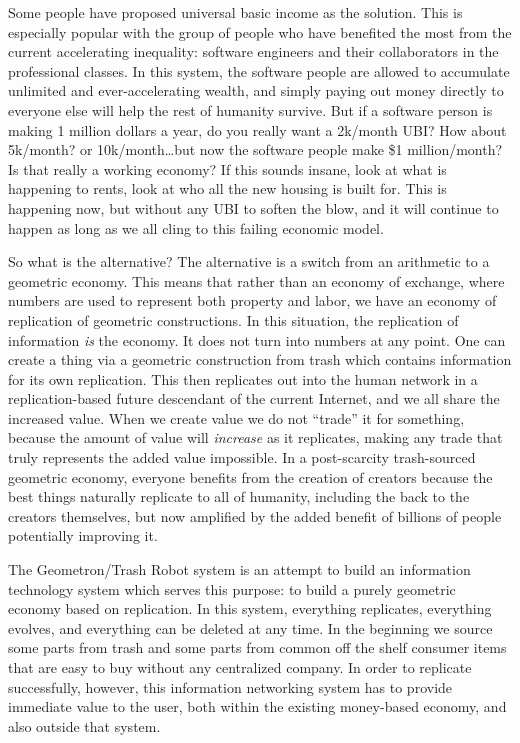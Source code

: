 \documentclass[12pt,a4paper]{amsart}
\numberwithin{equation}{section}
\begin{document}
Some people have proposed universal basic income as the solution. This
is especially popular with the group of people who have benefited the
most from the current accelerating inequality: software engineers and
their collaborators in the professional classes. In this system, the
software people are allowed to accumulate unlimited and
ever-accelerating wealth, and simply paying out money directly to
everyone else will help the rest of humanity survive. But if a software
person is making 1 million dollars a year, do you really want a 2k/month
UBI? How about 5k/month? or 10k/month\ldots{}but now the software people
make \$1 million/month? Is that really a working economy? If this sounds
insane, look at what is happening to rents, look at who all the new
housing is built for. This is happening now, but without any UBI to
soften the blow, and it will continue to happen as long as we all cling
to this failing economic model.

So what is the alternative? The alternative is a switch from an
arithmetic to a geometric economy. This means that rather than an
economy of exchange, where numbers are used to represent both property
and labor, we have an economy of replication of geometric constructions.
In this situation, the replication of information \emph{is} the economy.
It does not turn into numbers at any point. One can create a thing via a
geometric construction from trash which contains information for its own
replication. This then replicates out into the human network in a
replication-based future descendant of the current Internet, and we all
share the increased value. When we create value we do not ``trade'' it
for something, because the amount of value will \emph{increase} as it
replicates, making any trade that truly represents the added value
impossible. In a post-scarcity trash-sourced geometric economy, everyone
benefits from the creation of creators because the best things naturally
replicate to all of humanity, including the back to the creators
themselves, but now amplified by the added benefit of billions of people
potentially improving it.

The Geometron/Trash Robot system is an attempt to build an information
technology system which serves this purpose: to build a purely geometric
economy based on replication. In this system, everything replicates,
everything evolves, and everything can be deleted at any time. In the
beginning we source some parts from trash and some parts from common off
the shelf consumer items that are easy to buy without any centralized
company. In order to replicate successfully, however, this information
networking system has to provide immediate value to the user, both
within the existing money-based economy, and also outside that system.
\end{document}
